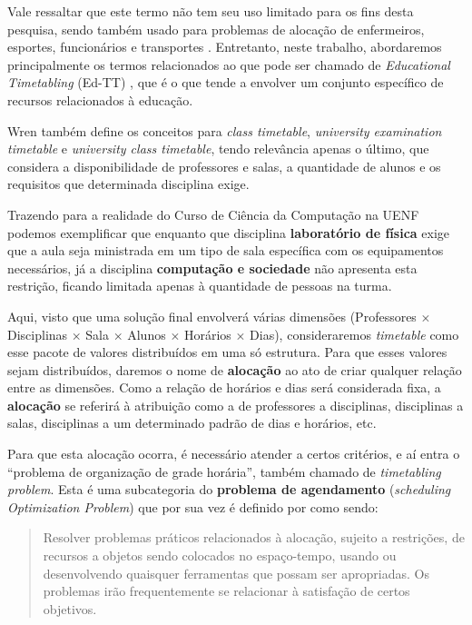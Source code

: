 Vale ressaltar que este termo não tem seu uso limitado para os fins desta pesquisa, sendo também usado para problemas de alocação de enfermeiros, esportes, funcionários e transportes \cite{arratia-martinez_university_2021}. Entretanto, neste trabalho, abordaremos principalmente os termos relacionados ao que pode ser chamado de \textit{Educational Timetabling} (Ed-TT) \cite{alencar_visualization_2019}, que é o que tende a envolver um conjunto específico de recursos relacionados à educação.


Wren também define os conceitos para \textit{class timetable}, \textit{university examination timetable} e \textit{university class timetable}, tendo relevância apenas o último, que considera a disponibilidade de professores e salas, a quantidade de alunos e os requisitos que determinada disciplina exige.

Trazendo para a realidade do Curso de Ciência da Computação na UENF podemos exemplificar que enquanto que disciplina \textbf{laboratório de física} exige que a aula seja ministrada em um tipo de sala específica com os equipamentos necessários, já a disciplina \textbf{computação e sociedade} não apresenta esta restrição, ficando limitada apenas à quantidade de pessoas na turma.

Aqui, visto que uma solução final envolverá várias dimensões (Professores $\times$ Disciplinas $\times$ Sala $\times$ Alunos $\times$ Horários $\times$ Dias), consideraremos \textit{timetable} como esse pacote de valores distribuídos em uma só estrutura. Para que esses valores sejam distribuídos, daremos o nome de \textbf{alocação} ao ato de criar qualquer relação entre as dimensões. Como a relação de horários e dias será considerada fixa, a \textbf{alocação} se referirá à atribuição como a de professores a disciplinas, disciplinas a salas, disciplinas a um determinado padrão de dias e horários, etc.

Para que esta alocação ocorra, é necessário atender a certos critérios, e aí entra o ``problema de organização de grade horária'', também chamado de \textit{timetabling problem}. Esta é uma subcategoria do \textbf{problema de agendamento} (\textit{scheduling Optimization Problem}) \cite{alencar_visualization_2019} que por sua vez é definido por  como sendo:

\begin{quote}\footnotesize
  Resolver problemas práticos relacionados à alocação, sujeito a restrições, de recursos a objetos sendo colocados no espaço-tempo, usando ou desenvolvendo quaisquer ferramentas que possam ser apropriadas. Os problemas irão frequentemente se relacionar à satisfação de certos objetivos.
\end{quote}


